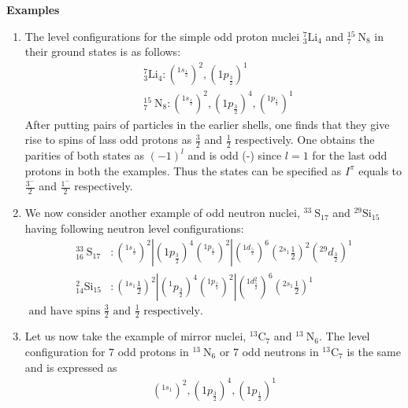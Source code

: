 \textbf{Examples}\\
\begin{enumerate}
	\item The level configurations for the simple odd proton nuclei ${ }_{3}^{7} \mathrm{Li}_{4}$ and ${ }_{7}^{15} \mathrm{~N}_{8}$ in their ground states is as follows:\\
	\begin{align*}
	&{ }_{3}^{7} \mathrm{Li}_{4}:\left({ }^{1 s_{\frac{1}{2}}}\right)^{2},\left(1 p_{\frac{3}{2}}\right)^{1} \\
	&{ }_{7}^{15} \mathrm{~N}_{8}:\left({ }^{1 s_{\frac{1}{2}}}\right)^{2},\left(1 p_{\frac{3}{2}}\right)^{4},\left({ }^{1 p_{\frac{1}{2}}}\right)^{1}
	\end{align*}
	After putting pairs of particles in the earlier shells, one finds that they give rise to spins of lass odd protons as $\frac{3}{2}$ and $\frac{1}{2}$ respectively. One obtains the parities of both states as $(-1)^{l}$ and is odd (-) since $l=1$ for the last odd protons in both the examples. Thus the states can be specified as $I^{\pi}$ equals to $\frac{3^{-}}{2}$ and $\frac{1^{-}}{2}$ respectively.
	\item We now consider another example of odd neutron nuclei, ${ }^{33} \mathrm{~S}_{17}$ and ${ }^{29} \mathrm{Si}_{15}$ having following neutron level configurations:\\
	\begin{align*}
	{ }_{16}^{33} \mathrm{~S}_{17}&:\left({ }^{1 s_{\frac{1}{2}}}\right)^{2}\left|\left(1 p_{\frac{3}{2}}\right)^{4}\left({ }^{1 p_{\frac{1}{2}}}\right)^{2}\right|\left({ }^{1 d_{\frac{5}{2}}}\right)^{6}\left({ }^{2 s_{1}} \frac{1}{2}\right)^{2}\left({ }^{29} d_{\frac{3}{2}}\right)^{1} \\
	{ }_{14}^{2} \mathrm{Si}_{15}&:\left({ }^{1 s_{1}} \frac{1}{2}\right)^{2}\left|\left({ }^{1} p_{\frac{3}{2}}\right)^{4}\left({ }^{1 p_{\frac{1}{2}}}\right)^{2}\right|\left({ }^{1 d_{\frac{5}{2}}^{2}}\right)^{6}\left({ }^{2 s_{1}} \frac{1}{2}\right)^{1}
	\end{align*}
	$\text { and have spins } \frac{3}{2} \text { and } \frac{1}{2} \text { respectively. }$
	\item Let us now take the example of mirror nuclei, ${ }^{13} \mathrm{C}_{7}$ and ${ }^{13} \mathrm{~N}_{6}$. The level configuration for 7 odd protons in ${ }^{13} \mathrm{~N}_{6}$ or 7 odd neutrons in ${ }^{13} \mathrm{C}_{7}$ is the same and is expressed as
	\begin{align*}
	\left({ }^{1 s_{1}}\right)^{2},\left(1 p_{\frac{3}{2}}\right)^{4},\left(1 p_{\frac{1}{2}}\right)^{1}

\end{align*}
\end{enumerate}
